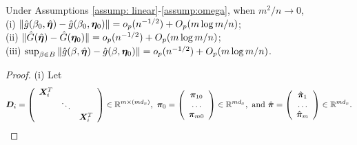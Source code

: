 \documentclass[12pt]{article}
\begin{document}
{\begin{lemma} \label{lemma: g beta, nuisance}
Under Assumptions \ref{assump: linear}-\ref{assump:omega}, when $ m^2/n\rightarrow 0 $, \\
(i)  $\|\hat g(\beta_0, \hat{\bm \eta}) -\hat g(\beta_0, \bm \eta_0) \|= o_p(n^{-1/2}) + O_p(m\log m/n)$;\\
(ii) $\| \hat G(\hat {\bm \eta}) -  \hat G( \bm \eta_0)\|= o_p(n^{-1/2}) + O_p(m\log m/n)$;\\
(iii) $\sup_{\beta\in B} \|\hat g(\beta, \hat{\bm \eta}) -\hat g(\beta, \bm \eta_0) \|= o_p(n^{-1/2}) + O_p(m\log m/n)$.
\end{lemma}
\begin{proof}
(i) Let 
\begin{align*}
	\bm D_i=  \left( 
	\begin{array}{ccc}
		\bm{X}_i^T &&  \\
		&	\ddots&\\
		&&	 \bm{X}_i^T  \\
	\end{array}
	\right)\in \mathbb{R}^{m\times (md_x)}, ~\bm \pi_0 = 
	\left( 
	\begin{array}{c}
		\bm\pi_{10}  \\
		\dots\\
		\bm\pi_{m0} \\
	\end{array}
	\right)\in \mathbb{R}^{ md_x},  ~ \text{and} ~   
	\hat{\bm \pi} =  \left( 
	\begin{array}{c}
		\hat{\bm\pi}_1  \\
		\dots\\
		\hat{\bm\pi}_m \\
	\end{array}
	\right)\in \mathbb{R}^{ md_x}.
\end{align*}



\end{proof}}
\end{document}
